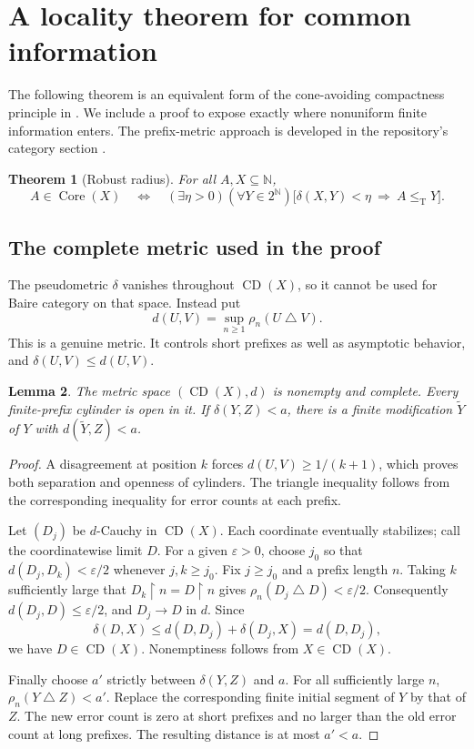 \documentclass[11pt,letterpaper]{article}
\theoremstyle{plain}
\newtheorem{theorem}{Theorem}[section]
\newtheorem{lemma}[theorem]{Lemma}
\theoremstyle{definition}
\theoremstyle{remark}
\numberwithin{equation}{section}
\newcommand{\N}{\mathbb N}
\newcommand{\Cantor}{2^{\N}}
\newcommand{\leT}{\leq_{\mathrm T}}
\newcommand{\Core}{\operatorname{Core}}
\newcommand{\CD}{\operatorname{CD}}
\newcommand{\sd}{\mathbin{\triangle}}
\newcommand{\rest}{\mathbin{\upharpoonright}}
\begin{document}
\section{A locality theorem for common information}\label{cr12:sec:radius}
The following theorem is an equivalent form of the cone-avoiding compactness
principle in \cite[Theorem~3.7]{HJKS}. We include a proof to expose exactly where
nonuniform finite information enters. The prefix-metric approach is developed
in the repository's category section \cite{Repo}.

\begin{theorem}[Robust radius]\label{cr12:thm:radius}
For all $A,X\subseteq\N$,
\begin{equation}\label{cr12:eq:radius}
 A\in\Core(X)
 \quad\Longleftrightarrow\quad
 (\exists\eta>0)(\forall Y\in\Cantor)
 \bigl[\delta(X,Y)<\eta\ \Longrightarrow\ A\leT Y\bigr].
\end{equation}
\end{theorem}

\subsection{The complete metric used in the proof}
The pseudometric $\delta$ vanishes throughout $\CD(X)$, so it cannot be used for
Baire category on that space. Instead put
\[
 d(U,V)=\sup_{n\ge1}\rho_n(U\sd V).
\]
This is a genuine metric. It controls short prefixes as well as asymptotic
behavior, and $\delta(U,V)\le d(U,V)$.

\begin{lemma}\label{cr12:lem:metric}
The metric space $(\CD(X),d)$ is nonempty and complete. Every finite-prefix
cylinder is open in it. If $\delta(Y,Z)<a$, there is a finite modification
$\widetilde Y$ of $Y$ with $d(\widetilde Y,Z)<a$.
\end{lemma}
\begin{proof}
A disagreement at position $k$ forces $d(U,V)\ge1/(k+1)$, which proves both
separation and openness of cylinders. The triangle inequality follows from the
corresponding inequality for error counts at each prefix.

Let $(D_j)$ be $d$-Cauchy in $\CD(X)$. Each coordinate eventually stabilizes;
call the coordinatewise limit $D$. For a given $\varepsilon>0$, choose $j_0$ so
that $d(D_j,D_k)<\varepsilon/2$ whenever $j,k\ge j_0$. Fix $j\ge j_0$ and a
prefix length $n$. Taking $k$ sufficiently large that $D_k\rest n=D\rest n$
gives $\rho_n(D_j\sd D)<\varepsilon/2$. Consequently
$d(D_j,D)\le\varepsilon/2$, and $D_j\to D$ in $d$.
Since
\[
 \delta(D,X)\le d(D,D_j)+\delta(D_j,X)=d(D,D_j),
\]
we have $D\in\CD(X)$. Nonemptiness follows from $X\in\CD(X)$.

Finally choose $a'$ strictly between $\delta(Y,Z)$ and $a$. For all sufficiently
large $n$, $\rho_n(Y\sd Z)<a'$. Replace the corresponding finite initial
segment of $Y$ by that of $Z$. The new error count is zero at short prefixes
and no larger than the old error count at long prefixes. The resulting distance
is at most $a'<a$.
\end{proof}
\end{document}

